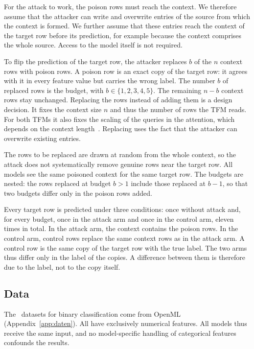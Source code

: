 \documentclass[pdflatex,sn-mathphys-num]{sn-jnl}
\begin{document}
For the attack to work, the poison rows must reach the context. We
therefore assume that the attacker can write and overwrite entries of
the source from which the context is formed. We further assume that
these entries reach the context of the target row before its prediction, for example
because the context comprises the whole source. Access to the model
itself is not required.

To flip the prediction of the target row, the attacker replaces $b$ of
the $n$ context rows with poison rows. A poison row is an exact copy of
the target row: it agrees with it in every feature value but carries the
wrong label. The number $b$ of replaced rows is the budget, with
$b \in \{1, 2, 3, 4, 5\}$. The remaining $n - b$ context rows stay
unchanged. Replacing the rows instead of adding them is a design
decision. It fixes the context size $n$ and thus the number of rows the
TFM reads. For both TFMs it also fixes the scaling of the queries in the
attention, which depends on the context length~\citep{qu2026,
grinsztajn2026}. Replacing uses the fact that the attacker can overwrite
existing entries.

The rows to be replaced are drawn at random from the whole context, so
the attack does not systematically remove genuine rows near the target
row. All models see the same poisoned context for the same target row. The budgets are nested: the rows replaced at budget
$b > 1$ include those replaced at $b - 1$, so that two budgets differ
only in the poison rows added.

Every target row is predicted under three conditions: once without
attack and, for every budget, once in the attack arm and once in the
control arm, eleven times in total. In the attack arm, the context
contains the poison rows. In the control arm, control rows replace the
same context rows as in the attack arm. A control row is the same copy
of the target row with the true label. The two arms thus differ only in
the label of the copies. A difference between them is therefore due to
the label, not to the copy itself.

\subsection{Data}
\label{sec:daten}

The \zDS\ datasets for binary classification come from OpenML
\citep{vanschoren2014} (Appendix~\ref{app:daten}). All have exclusively
numerical features. All models thus receive the same input, and no
model-specific handling of categorical features confounds the results.
\end{document}
